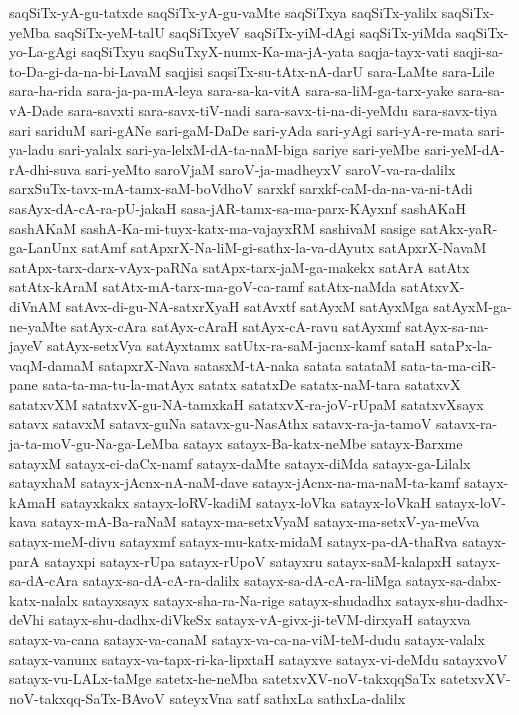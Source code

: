 {saqSiTx-yA-gu-tatxde
saqSiTx-yA-gu-vaMte
saqSiTxya
saqSiTx-yalilx
saqSiTx-yeMba
saqSiTx-yeM-talU
saqSiTxyeV
saqSiTx-yiM-dAgi
saqSiTx-yiMda
saqSiTx-yo-La-gAgi
saqSiTxyu
saqSuTxyX-numx-Ka-ma-jA-yata
saqja-tayx-vati
saqji-sa-to-Da-gi-da-na-bi-LavaM
saqjisi
saqsiTx-su-tAtx-nA-darU
sara-LaMte
sara-Lile
sara-ha-rida
sara-ja-pa-mA-leya
sara-sa-ka-vitA
sara-sa-liM-ga-tarx-yake
sara-sa-vA-Dade
sara-savxti
sara-savx-tiV-nadi
sara-savx-ti-na-di-yeMdu
sara-savx-tiya
sari
sariduM
sari-gANe
sari-gaM-DaDe
sari-yAda
sari-yAgi
sari-yA-re-mata
sari-ya-ladu
sari-yalalx
sari-ya-lelxM-dA-ta-naM-biga
sariye
sari-yeMbe
sari-yeM-dA-rA-dhi-suva
sari-yeMto
saroVjaM
saroV-ja-madheyxV
saroV-va-ra-dalilx
sarxSuTx-tavx-mA-tamx-saM-boVdhoV
sarxkf
sarxkf-caM-da-na-va-ni-tAdi
sasAyx-dA-cA-ra-pU-jakaH
sasa-jAR-tamx-sa-ma-parx-KAyxnf
sashAKaH
sashAKaM
sashA-Ka-mi-tuyx-katx-ma-vajayxRM
sashivaM
sasige
satAkx-yaR-ga-LanUnx
satAmf
satApxrX-Na-liM-gi-sathx-la-va-dAyutx
satApxrX-NavaM
satApx-tarx-darx-vAyx-paRNa
satApx-tarx-jaM-ga-makekx
satArA
satAtx
satAtx-kAraM
satAtx-mA-tarx-ma-goV-ca-ramf
satAtx-naMda
satAtxvX-diVnAM
satAvx-di-gu-NA-satxrXyaH
satAvxtf
satAyxM
satAyxMga
satAyxM-ga-ne-yaMte
satAyx-cAra
satAyx-cAraH
satAyx-cA-ravu
satAyxmf
satAyx-sa-na-jayeV
satAyx-setxVya
satAyxtamx
satUtx-ra-saM-jacnx-kamf
sataH
sataPx-la-vaqM-damaM
satapxrX-Nava
satasxM-tA-naka
satata
satataM
sata-ta-ma-ciR-pane
sata-ta-ma-tu-la-matAyx
satatx
satatxDe
satatx-naM-tara
satatxvX
satatxvXM
satatxvX-gu-NA-tamxkaH
satatxvX-ra-joV-rUpaM
satatxvXsayx
satavx
satavxM
satavx-guNa
satavx-gu-NasAthx
satavx-ra-ja-tamoV
satavx-ra-ja-ta-moV-gu-Na-ga-LeMba
satayx
satayx-Ba-katx-neMbe
satayx-Barxme
satayxM
satayx-ci-daCx-namf
satayx-daMte
satayx-diMda
satayx-ga-Lilalx
satayxhaM
satayx-jAcnx-nA-naM-dave
satayx-jAcnx-na-ma-naM-ta-kamf
satayx-kAmaH
satayxkakx
satayx-loRV-kadiM
satayx-loVka
satayx-loVkaH
satayx-loV-kava
satayx-mA-Ba-raNaM
satayx-ma-setxVyaM
satayx-ma-setxV-ya-meVva
satayx-meM-divu
satayxmf
satayx-mu-katx-midaM
satayx-pa-dA-thaRva
satayx-parA
satayxpi
satayx-rUpa
satayx-rUpoV
satayxru
satayx-saM-kalapxH
satayx-sa-dA-cAra
satayx-sa-dA-cA-ra-dalilx
satayx-sa-dA-cA-ra-liMga
satayx-sa-dabx-katx-nalalx
satayxsayx
satayx-sha-ra-Na-rige
satayx-shudadhx
satayx-shu-dadhx-deVhi
satayx-shu-dadhx-diVkeSx
satayx-vA-givx-ji-teVM-dirxyaH
satayxva
satayx-va-cana
satayx-va-canaM
satayx-va-ca-na-viM-teM-dudu
satayx-valalx
satayx-vanunx
satayx-va-tapx-ri-ka-lipxtaH
satayxve
satayx-vi-deMdu
satayxvoV
satayx-vu-LALx-taMge
satetx-he-neMba
satetxvXV-noV-takxqqSaTx
satetxvXV-noV-takxqq-SaTx-BAvoV
sateyxVna
satf
sathxLa
sathxLa-dalilx
}
